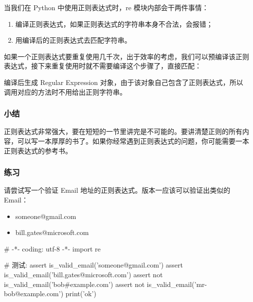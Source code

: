 当我们在 Python 中使用正则表达式时，re 模块内部会干两件事情：

\begin{enumerate}
\def\labelenumi{\arabic{enumi}.}
\item
  编译正则表达式，如果正则表达式的字符串本身不合法，会报错；
\item
  用编译后的正则表达式去匹配字符串。
\end{enumerate}

如果一个正则表达式要重复使用几千次，出于效率的考虑，我们可以预编译该正则表达式，接下来重复使用时就不需要编译这个步骤了，直接匹配：


编译后生成 Regular Expression
对象，由于该对象自己包含了正则表达式，所以调用对应的方法时不用给出正则字符串。

\hypertarget{ux5c0fux7ed3}{%
\subsubsection{小结}\label{ux5c0fux7ed3}}

正则表达式非常强大，要在短短的一节里讲完是不可能的。要讲清楚正则的所有内容，可以写一本厚厚的书了。如果你经常遇到正则表达式的问题，你可能需要一本正则表达式的参考书。

\hypertarget{ux7ec3ux4e60}{%
\subsubsection{练习}\label{ux7ec3ux4e60}}

请尝试写一个验证 Email 地址的正则表达式。版本一应该可以验证出类似的
Email：

\begin{itemize}
\item
  someone@gmail.com
\item
  bill.gates@microsoft.com
\end{itemize}

\begin{pythoncode}
# -*- coding: utf-8 -*-
import re
\end{pythoncode}

\begin{pythoncode}
# 测试:
assert is_valid_email('someone@gmail.com')
assert is_valid_email('bill.gates@microsoft.com')
assert not is_valid_email('bob#example.com')
assert not is_valid_email('mr-bob@example.com')
print('ok')
\end{pythoncode}

